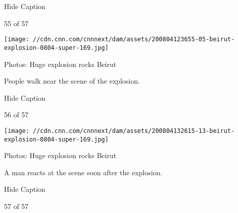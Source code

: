 Hide Caption

55 of 57

\texttt{[image: //cdn.cnn.com/cnnnext/dam/assets/200804123655-05-beirut-explosion-0804-super-169.jpg]}

Photos: Huge explosion rocks Beirut

People walk near the scene of the explosion.

Hide Caption

56 of 57

\texttt{[image: //cdn.cnn.com/cnnnext/dam/assets/200804132615-13-beirut-explosion-0804-super-169.jpg]}

Photos: Huge explosion rocks Beirut

A man reacts at the scene soon after the explosion.

Hide Caption

57 of 57


